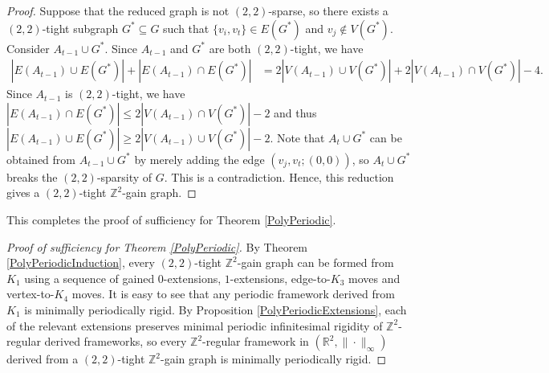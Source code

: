 \documentclass[reqno,a4paper,10pt]{article}
\theoremstyle{definition}
\theoremstyle{remark}
\numberwithin{equation}{section}
\numberwithin{figure}{section}
\numberwithin{table}{section}
\newcommand{\R}{\mathbb{R}}
\newcommand{\Z}{\mathbb{Z}}
\begin{document}
\begin{proof}
		Suppose that the reduced graph is not $(2,2)$-sparse, so there exists a $(2,2)$-tight subgraph $G^*\subseteq G$ such that $\{v_i,v_t\}\in E(G^*)$ and $v_j\notin V(G^*)$. Consider $A_{t-1}\cup G^*$. Since $A_{t-1}$ and $G^*$ are both $(2,2)$-tight, we have
		\begin{align*}
			|E(A_{t-1})\cup E(G^*)|+|E(A_{t-1})\cap E(G^*)|&=2|V(A_{t-1})\cup V(G^*)|+2|V(A_{t-1})\cap V(G^*)|-4.
		\end{align*}
		Since $A_{t-1}$ is $(2,2)$-tight, we have $|E(A_{t-1})\cap E(G^*)|\leq2|V(A_{t-1})\cap V(G^*)|-2$ and thus
			$|E(A_{t-1})\cup E(G^*)|\geq2|V(A_{t-1})\cup V(G^*)|-2$.
		Note that $A_t\cup G^*$ can be obtained from $A_{t-1}\cup G^*$ by merely adding the edge $(v_j,v_t;(0,0))$, so $A_t\cup G^*$ breaks the $(2,2)$-sparsity of $G$. This is a contradiction. Hence, this reduction gives a $(2,2)$-tight $\Z^2$-gain graph.
	\end{proof}
	This completes the proof of sufficiency for Theorem \ref{PolyPeriodic}.
    \begin{proof}[Proof of sufficiency for Theorem \ref{PolyPeriodic}]
        By Theorem \ref{PolyPeriodicInduction}, every $(2,2)$-tight $\Z^2$-gain graph can be formed from $K_1$ using a sequence of gained $0$-extensions, $1$-extensions, edge-to-$K_3$ moves and vertex-to-$K_4$ moves. It is easy to see that any periodic framework derived from $K_1$ is minimally periodically rigid. By Proposition \ref{PolyPeriodicExtensions}, each of the relevant extensions preserves minimal periodic infinitesimal rigidity of $\Z^2$-regular derived frameworks, so every $\Z^2$-regular framework in $(\R^2,\|\cdot\|_\infty)$ derived from a $(2,2)$-tight $\Z^2$-gain graph is minimally periodically rigid.
    \end{proof}
\end{document}
